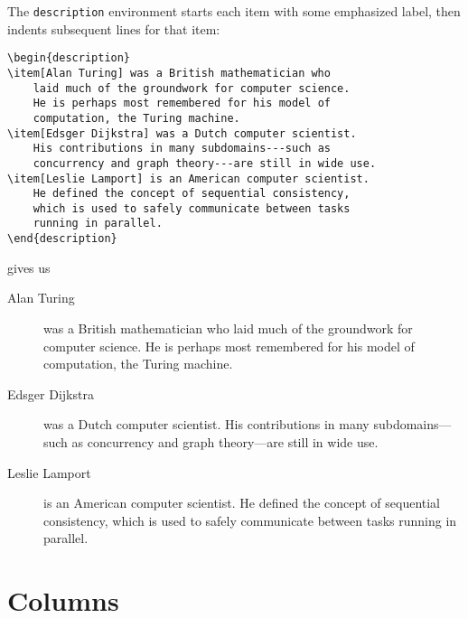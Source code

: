 \bigskip
\noindent The \texttt{description} environment starts each item with some
emphasized label,
then indents subsequent lines for that item:
\begin{leftfigure}
\begin{lstlisting}
\begin{description}
\item[Alan Turing] was a British mathematician who
    laid much of the groundwork for computer science.
    He is perhaps most remembered for his model of
    computation, the Turing machine.
\item[Edsger Dijkstra] was a Dutch computer scientist.
    His contributions in many subdomains---such as
    concurrency and graph theory---are still in wide use.
\item[Leslie Lamport] is an American computer scientist.
    He defined the concept of sequential consistency,
    which is used to safely communicate between tasks
    running in parallel.
\end{description}
\end{lstlisting}
\end{leftfigure}
gives us
\begin{leftfigure}
\lm%
\begin{description}
\item[\lm Alan Turing] was a British mathematician who
    laid much of the groundwork for computer science.
    He is perhaps most remembered for his model of computation,
    the Turing machine.
\item[\lm Edsger Dijkstra] was a Dutch computer scientist.
    His contributions in many subdomains---such as
    concurrency and graph theory---are still in wide use.
\item[\lm Leslie Lamport] is an American computer scientist.
    He defined the concept of sequential consistency,
    which is used to safely communicate between tasks
    running in parallel.
\end{description}
\end{leftfigure}

\section{Columns}

